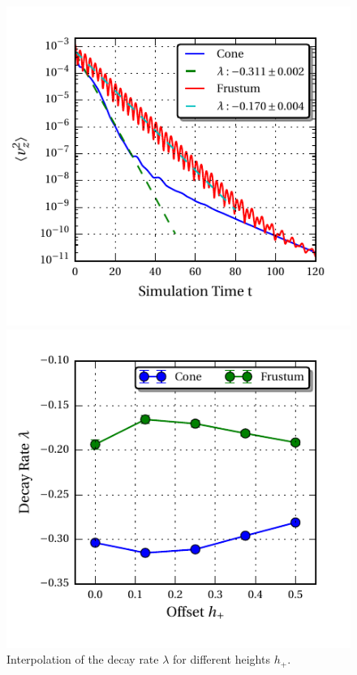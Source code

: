 \begin{figure}[!b]
\centering
\begin{minipage}{.5\textwidth}
  \centering
  \includegraphics{gfx/cone/final/decay/decay_example.pdf}
  \caption{
      \label{fig:cone:finaldecayexample}
      Decay of the M\RN{1} peak in the frustum in comparison the cone.
    }
\end{minipage}%
\begin{minipage}{.5\textwidth}
  \centering
  \includegraphics{gfx/cone/final/decay/fit_decay.pdf}
  \caption{
      \label{fig:cone:finaldecayfit}
      Interpolation of the decay rate $\lambda$ for different heights $h_+$.
    }
\end{minipage}
\end{figure}

